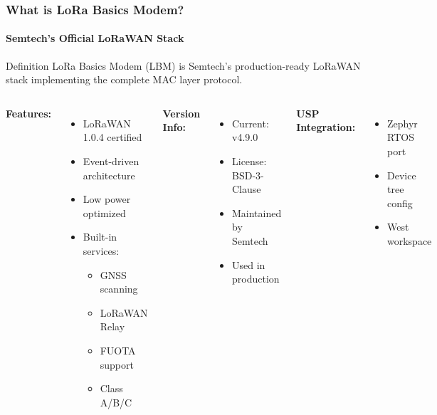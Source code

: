 \documentclass{beamer}
\begin{document}
\begin{frame}
\frametitle{What is LoRa Basics Modem?}
\framesubtitle{Semtech's Official LoRaWAN Stack}

\begin{block}{Definition}
LoRa Basics Modem (LBM) is Semtech's production-ready LoRaWAN stack implementing the complete MAC layer protocol.
\end{block}

\begin{columns}[T]
\textbf{Features:}
\begin{itemize}
    \item LoRaWAN 1.0.4 certified
    \item Event-driven architecture
    \item Low power optimized
    \item Built-in services:
    \begin{itemize}
        \item GNSS scanning
        \item LoRaWAN Relay
        \item FUOTA support
        \item Class A/B/C
    \end{itemize}
\end{itemize}

\textbf{Version Info:}
\begin{itemize}
    \item Current: v4.9.0
    \item License: BSD-3-Clause
    \item Maintained by Semtech
    \item Used in production
\end{itemize}

\vspace{1em}

\textbf{USP Integration:}
\begin{itemize}
    \item Zephyr RTOS port
    \item Device tree config
    \item West workspace
\end{itemize}
\end{columns}
\end{frame}
\end{document}
